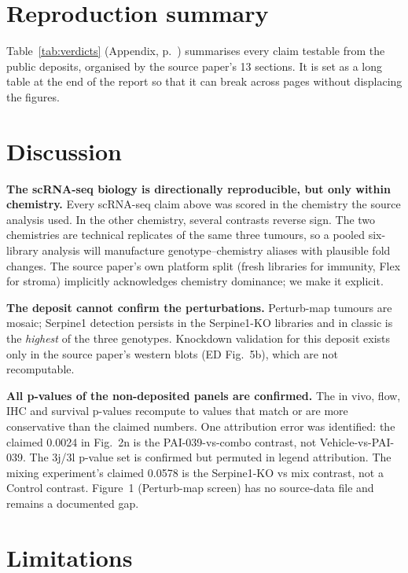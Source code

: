 \documentclass[preprint,12pt]{elsarticle}
\begin{document}

\section{Reproduction summary}

Table~\ref{tab:verdicts} (Appendix, p.~\pageref{tab:verdicts})
summarises every claim testable from the public deposits, organised by
the source paper's 13 sections. It is set as a long table at the end of
the report so that it can break across pages without displacing the
figures.


\section{Discussion}

\textbf{The scRNA-seq biology is directionally reproducible, but
only within chemistry.} Every scRNA-seq claim above was scored in
the chemistry the source analysis used. In the other chemistry,
several contrasts reverse sign. The two chemistries are technical
replicates of the same three tumours, so a pooled six-library
analysis will manufacture genotype--chemistry aliases with
plausible fold changes. The source paper's own platform split
(fresh libraries for immunity, Flex for stroma) implicitly
acknowledges chemistry dominance; we make it explicit.

\textbf{The deposit cannot confirm the perturbations.} Perturb-map
tumours are mosaic; Serpine1 detection persists in the Serpine1-KO
libraries and in classic is the \emph{highest} of the three
genotypes. Knockdown validation for this deposit exists only in the
source paper's western blots (ED Fig.~5b), which are not
recomputable.

\textbf{All p-values of the non-deposited panels are confirmed.}
The in vivo, flow, IHC and survival p-values recompute to values
that match or are more conservative than the claimed numbers. One
attribution error was identified: the claimed 0.0024 in Fig.~2n
is the PAI-039-vs-combo contrast, not Vehicle-vs-PAI-039. The
3j/3l p-value set is confirmed but permuted in legend attribution.
The mixing experiment's claimed 0.0578 is the Serpine1-KO vs mix
contrast, not a Control contrast. Figure~1 (Perturb-map screen)
has no source-data file and remains a documented gap.

\section{Limitations}
\end{document}
